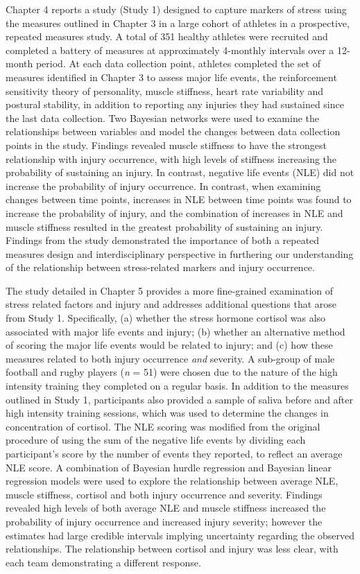 \documentclass[
  english,
  man,floatsintext]{apa6}
\begin{document}
Chapter 4 reports a study (Study 1) designed to capture markers of stress using the measures outlined in Chapter 3 in a large cohort of athletes in a prospective, repeated measures study.
A total of 351 healthy athletes were recruited and completed a battery of measures at approximately 4-monthly intervals over a 12-month period.
At each data collection point, athletes completed the set of measures identified in Chapter 3 to assess major life events, the reinforcement sensitivity theory of personality, muscle stiffness, heart rate variability and postural stability, in addition to reporting any injuries they had sustained since the last data collection.
Two Bayesian networks were used to examine the relationships between variables and model the changes between data collection points in the study.
Findings revealed muscle stiffness to have the strongest relationship with injury occurrence, with high levels of stiffness increasing the probability of sustaining an injury.
In contrast, negative life events (NLE) did not increase the probability of injury occurrence. In contrast, when examining changes between time points, increases in NLE between time points was found to increase the probability of injury, and the combination of increases in NLE and muscle stiffness resulted in the greatest probability of sustaining an injury.
Findings from the study demonstrated the importance of both a repeated measures design and interdisciplinary perspective in furthering our understanding of the relationship between stress-related markers and injury occurrence.

The study detailed in Chapter 5 provides a more fine-grained examination of stress related factors and injury and addresses additional questions that arose from Study 1.
Specifically,
(a) whether the stress hormone cortisol was also associated with major life events and injury;
(b) whether an alternative method of scoring the major life events would be related to injury; and
(c) how these measures related to both injury occurrence \emph{and} severity.
A sub-group of male football and rugby players (\emph{n} = 51) were chosen due to the nature of the high intensity training they completed on a regular basis.
In addition to the measures outlined in Study 1, participants also provided a sample of saliva before and after high intensity training sessions, which was used to determine the changes in concentration of cortisol.
The NLE scoring was modified from the original procedure of using the sum of the negative life events by dividing each participant's score by the number of events they reported, to reflect an average NLE score.
A combination of Bayesian hurdle regression and Bayesian linear regression models were used to explore the relationship between average NLE, muscle stiffness, cortisol and both injury occurrence and severity.
Findings revealed high levels of both average NLE and muscle stiffness increased the probability of injury occurrence and increased injury severity; however the estimates had large credible intervals implying uncertainty regarding the observed relationships.
The relationship between cortisol and injury was less clear, with each team demonstrating a different response.
\end{document}
